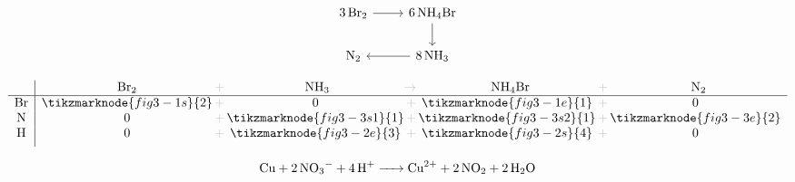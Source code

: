\documentclass{ctexart}
\newcommand{\grayplus}{\,\color{lightgray}+\,}
\newcommand{\grayto}{\,\color{lightgray}\to\,}
\newcommand{\arrowLR}[3]{%
    \draw[->|,red,thick]
    ([xshift=2pt]#1.south east)
    .. controls ++(0.3cm,-0.2cm) and ++(-0.3cm,-0.2cm) ..
    ([xshift=-2pt]#2.south west)
    node[midway,below,blue,font=\small] {#3};
}
\newcommand{\arrowRL}[3]{%
    \draw[->|,red,thick]
    ([xshift=-2pt]#1.south west)
    .. controls ++(-0.3cm,-0.2cm) and ++(0.3cm,-0.2cm) ..
    ([xshift=2pt]#2.south east)
    node[midway,below,blue,font=\small] {#3};
}
\newcommand{\arrowsToOneLR}[4]{%
    \draw[->,red,thick]
    ([xshift=2pt]#1.south east)
    .. controls ++(0.3cm,-0.2cm) and ++(-0.3cm,-0.2cm) ..
    ([xshift=-2pt]#3.south west)
    node[midway,below,blue,font=\small] {#4};
    \draw[->,red,thick]
    (#2.south)
    .. controls ++(0.3cm,-0.2cm) and ++(-0.3cm,-0.2cm) ..
    ([xshift=-2pt]#3.south west);
}
\begin{document}
{\begin{center}
\begin{minipage}[c]{0.4\textwidth}
            \[
                \begin{tikzcd}
                    \ce{3Br2} \arrow[r] & \ce{6NH4Br} \arrow[d] \\
                    \ce{N2} & \ce{8NH3} \arrow[l]
                \end{tikzcd}
            \]
        \end{minipage}%
        \hspace{0.01\textwidth}
        \begin{minipage}[c]{0.4\textwidth}
            \[
                \begin{array}{c|*{3}{c@{\grayplus}}c}
                    & \multicolumn{1}{c@{\grayplus}}{\ce{Br2}} &
                    \multicolumn{1}{c@{\grayto}}{\ce{NH3}} &
                    \multicolumn{1}{c@{\grayplus}}{\ce{NH4Br}} &
                    \multicolumn{1}{c}{\ce{N2}} \\
                    \hline
                    \ce{Br} & \tikzmarknode{fig3-1s}{2} & 0 &
                    \tikzmarknode{fig3-1e}{1} & 0\\
                    \ce{N} & 0 & \tikzmarknode{fig3-3s1}{1} &
                    \tikzmarknode{fig3-3s2}{1} & \tikzmarknode{fig3-3e}{2}\\
                    \ce{H} & 0 & \tikzmarknode{fig3-2e}{3}
                    &\tikzmarknode{fig3-2s}{4} & 0\\[1ex]
                \end{array}
            \]
        \end{minipage}
    \end{center}


    \begin{center}
        \noindent
        \begin{minipage}[c]{0.42\textwidth}
            \[
                \ce{Cu + 2NO3^- + 4H+ -> Cu^{2+} + 2NO2 + 2H2O}
            \]


\end{minipage}
\end{center}}
\end{document}
